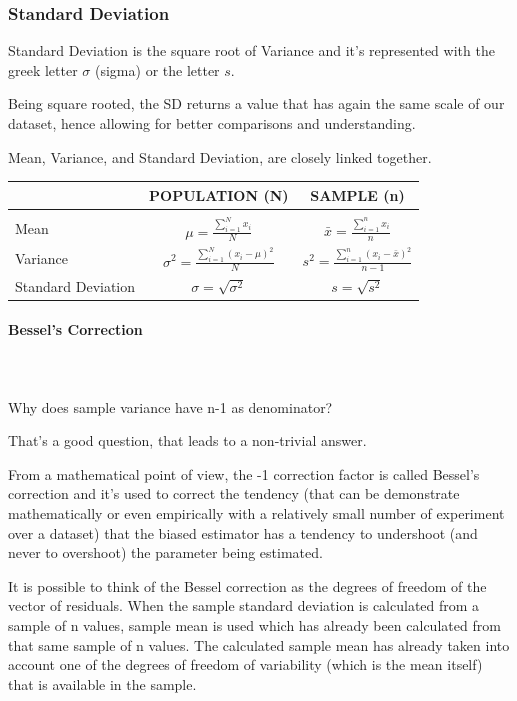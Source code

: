 \documentclass{article}
\begin{document}
\subsubsection{Standard Deviation}
Standard Deviation is the square root of Variance and it’s represented with the greek letter $\sigma$ (sigma) or the letter $s$.

Being square rooted, the SD returns a value that has again the same scale of our dataset, hence allowing for better comparisons and understanding. 

Mean, Variance, and Standard Deviation, are closely linked together. 

\begin{center}
\begin{tabular}{|m{2cm}|c|c|}
\hline
& POPULATION (N) & SAMPLE (n) \\ \hline
&&\\[-1em]
Mean & $\displaystyle \mu = \frac{\sum\limits _{i=1}^{N} x_{i}}{N}$ & $\displaystyle \bar{x} = \frac{\sum\limits _{i=1}^{n} x_{i}}{n}$ \\[25pt]
Variance & $\displaystyle \sigma^2 = \frac{\sum\limits _{i=1}^{N} (x_{i} - \mu)^2}{N}$ & $\displaystyle s^2 = \frac{\sum\limits _{i=1}^{n} (x_{i} - \bar{x})^2}{n-1}$ \\[25pt]
Standard Deviation & $\displaystyle \sigma = \sqrt{\sigma^2}$ & $\displaystyle s = \sqrt{s^2}$ \\[25pt] 
\hline
\end{tabular}
\end{center}

\paragraph{Bessel's Correction}\mbox{} \\ 
\mbox{} \\

Why does sample variance have n-1 as denominator?

That’s a good question, that leads to a non-trivial answer. 

From a mathematical point of view, the -1 correction factor is called Bessel’s correction and it’s used to correct the tendency (that can be demonstrate mathematically or even empirically with a relatively small number of experiment over a dataset) that the biased estimator has a tendency to undershoot (and never to overshoot) the parameter being estimated.  

It is possible to think of the Bessel correction as the degrees of freedom of the vector of residuals. When the sample standard deviation is calculated from a sample of n values, sample mean is used which has already been calculated from that same sample of n values. The calculated sample mean has already taken into account one of the degrees of freedom of variability (which is the mean itself) that is available in the sample.
\end{document}
